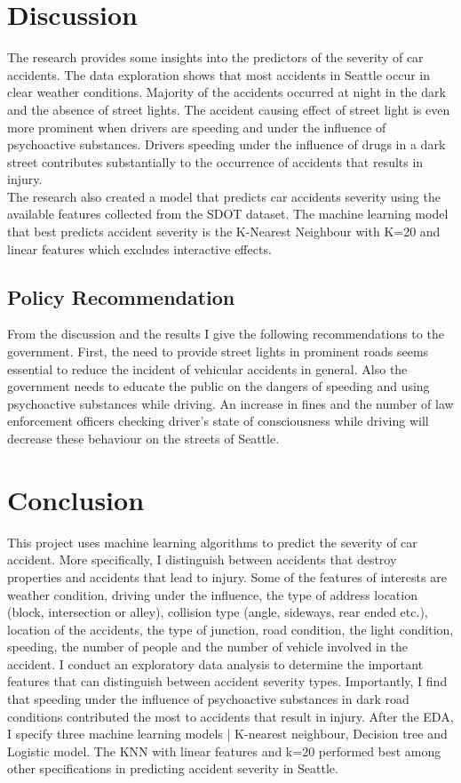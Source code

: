 \documentclass[a4paper,12pt]{article}
\begin{document}
\section{Discussion}
The research provides some insights into the predictors of the severity of car accidents. The data exploration shows that most accidents in Seattle occur in clear weather conditions. Majority of the accidents occurred at night in the dark and the absence of street lights. The accident causing effect of street light is even more prominent when drivers are speeding and under the influence of psychoactive substances. Drivers speeding under the influence of drugs in a dark street contributes substantially to the occurrence of accidents that results in injury.\\

The research also created a model that predicts car accidents severity using the available features collected from the SDOT dataset. The machine learning model that best predicts accident severity is the K-Nearest Neighbour with K=20 and linear features which excludes interactive effects.

\subsection{Policy Recommendation}
From the discussion and the results I give the following recommendations to the government. First, the need to provide street lights in prominent roads seems essential to reduce the incident of vehicular accidents in general. Also the government needs to educate the public on the dangers of speeding and using psychoactive substances while driving. An increase in fines and the number of law enforcement officers checking driver's state of consciousness while driving will decrease these behaviour on the streets of Seattle.

\section{Conclusion}
This project uses machine learning algorithms to predict the severity of car accident. More specifically, I distinguish between accidents that destroy properties and accidents that lead to injury. Some of the features of interests are weather condition, driving under the influence, the type of address location (block, intersection or alley), collision type (angle, sideways, rear ended etc.), location of the accidents, the type of junction, road condition, the light condition, speeding, the number of people and the number of vehicle involved in the accident. I conduct an exploratory data analysis to determine the important features that can distinguish between accident severity types. Importantly, I find that speeding under the influence of psychoactive substances in dark road conditions contributed the most to accidents that result in injury. After the EDA, I specify three machine learning models | K-nearest neighbour, Decision tree and Logistic model. The KNN with linear features and k=20 performed best among other specifications in predicting accident severity in Seattle.
\end{document}
